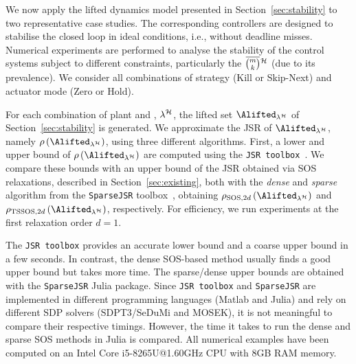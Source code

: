 We now apply the lifted dynamics model presented in Section~\ref{sec:stability} to two representative case studies.
The corresponding controllers are designed to stabilise the closed loop in ideal conditions, i.e., without deadline misses.
Numerical experiments are performed to analyse the stability of the control systems subject to different constraints, particularly the $\overbar{\binom{m}{k}}^{\strat}$ (due to its prevalence).
%
We consider all combinations of strategy (Kill or Skip-Next) and actuator mode (Zero or Hold).

For each combination of plant and \ewhc{}, $\lambda^{\mathcal{H}}$, the lifted set $\Alifted_{\lambda^\strat}$ of Section~\ref{sec:stability} is generated.
%
We approximate the JSR of $\Alifted_{\lambda^\strat}$, namely $\rho \left( \Alifted_{\lambda^\strat} \right)$, using three different algorithms.
First, a lower and upper bound of $\rho \left( \Alifted_{\lambda^\strat} \right)$ are computed using the \texttt{JSR toolbox}~\cite{vankeerberghen2014jsr}.
We compare these bounds with an upper bound of the JSR obtained via SOS relaxations, described in Section~\ref{sec:existing}, both with the \emph{dense} and \emph{sparse} algorithm from the \texttt{SparseJSR} toolbox~\cite{sparsejsr}, obtaining $\rho_{\textrm{SOS},2d}\left(\Alifted_{\lambda^\strat}\right)$ and $\rho_{\textrm{TSSOS},2d}\left(\Alifted_{\lambda^\strat}\right)$, respectively.
%
For efficiency, we run experiments at the first relaxation order $d = 1$.

The \texttt{JSR toolbox} provides an accurate lower bound and a coarse upper bound in a few seconds.
In contrast, the dense SOS-based method usually finds a good upper bound but takes more time.
The sparse/dense upper bounds are obtained with the \texttt{SparseJSR} Julia package.
Since \texttt{JSR toolbox} and \texttt{SparseJSR} are implemented in different programming languages (Matlab and Julia) and rely on different SDP solvers (SDPT3/SeDuMi and MOSEK), it is not meaningful to compare their respective timings.
However, the time it takes to run the dense and sparse SOS methods in Julia is compared.
All numerical examples have been computed on an Intel Core i5-8265U@1.60GHz CPU with 8GB RAM memory.

